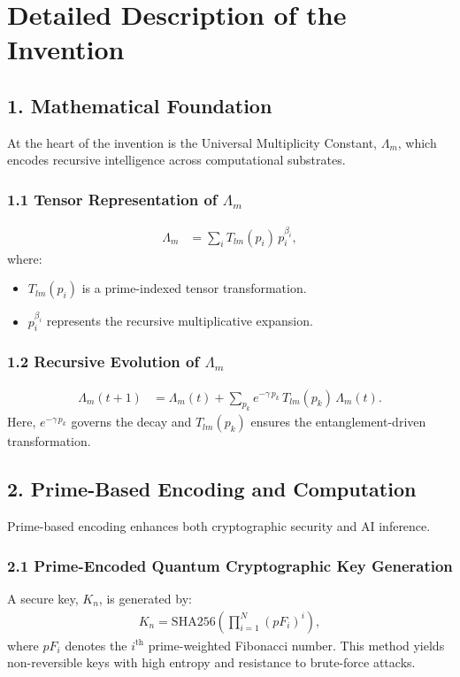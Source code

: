 \documentclass[12pt]{article}
\begin{document}
\section*{Detailed Description of the Invention}

\subsection*{1. Mathematical Foundation}
At the heart of the invention is the Universal Multiplicity Constant, $\Lambda_m$, which encodes recursive intelligence across computational substrates.

\subsubsection*{1.1 Tensor Representation of $\Lambda_m$}
\begin{align}
\Lambda_m &= \sum_{i} T_{lm}(p_i)\, p_i^{\beta_i},
\end{align}
where:
\begin{itemize}
    \item $T_{lm}(p_i)$ is a prime-indexed tensor transformation.
    \item $p_i^{\beta_i}$ represents the recursive multiplicative expansion.
\end{itemize}

\subsubsection*{1.2 Recursive Evolution of $\Lambda_m$}
\begin{align}
\Lambda_m(t+1) &= \Lambda_m(t) + \sum_{p_k} e^{-\gamma\, p_k}\, T_{lm}(p_k)\, \Lambda_m(t).
\end{align}
Here, $e^{-\gamma\, p_k}$ governs the decay and $T_{lm}(p_k)$ ensures the entanglement-driven transformation.

\subsection*{2. Prime-Based Encoding and Computation}
Prime-based encoding enhances both cryptographic security and AI inference.

\subsubsection*{2.1 Prime-Encoded Quantum Cryptographic Key Generation}
A secure key, $K_n$, is generated by:
\begin{align}
K_n = \mathrm{SHA256}\!\left(\prod_{i=1}^{N} \left(pF_i\right)^i\right),
\end{align}
where $pF_i$ denotes the $i^\text{th}$ prime-weighted Fibonacci number. This method yields non-reversible keys with high entropy and resistance to brute-force attacks.
\end{document}
